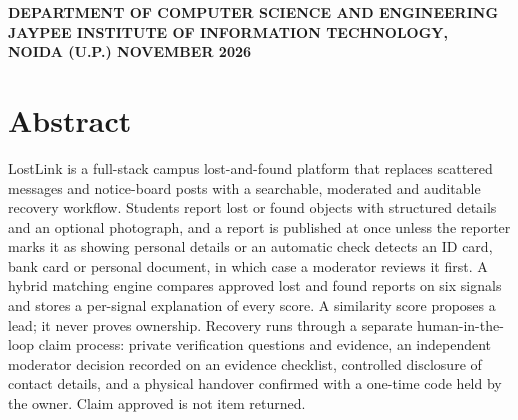 \documentclass[12pt,a4paper,oneside]{report}
\newif\ifcoverpage
\begin{document}
\begin{titlepage}
\vspace{6mm plus 1fill}
\begin{center}
{\fontsize{12}{15}\selectfont\bfseries
DEPARTMENT OF COMPUTER SCIENCE AND ENGINEERING\\
JAYPEE INSTITUTE OF INFORMATION TECHNOLOGY,\\
NOIDA (U.P.) NOVEMBER 2026\par}
\end{center}
\vspace{2mm}
\endgroup
\end{titlepage}
\coverpagefalse

\setcounter{page}{1}

\chapter*{Abstract}
LostLink is a full-stack campus lost-and-found platform that replaces scattered messages and notice-board posts with a searchable, moderated and auditable recovery workflow. Students report lost or found objects with structured details and an optional photograph, and a report is published at once unless the reporter marks it as showing personal details or an automatic check detects an ID card, bank card or personal document, in which case a moderator reviews it first. A hybrid matching engine compares approved lost and found reports on six signals and stores a per-signal explanation of every score. A similarity score proposes a lead; it never proves ownership. Recovery runs through a separate human-in-the-loop claim process: private verification questions and evidence, an independent moderator decision recorded on an evidence checklist, controlled disclosure of contact details, and a physical handover confirmed with a one-time code held by the owner. Claim approved is not item returned.
\end{document}
